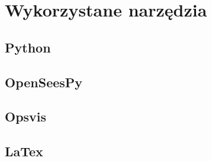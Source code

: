 \newpage
\section{Wykorzystane narzędzia}

\subsection{Python}
\subsection{OpenSeesPy}
\subsection{Opsvis}
\subsection{LaTex}